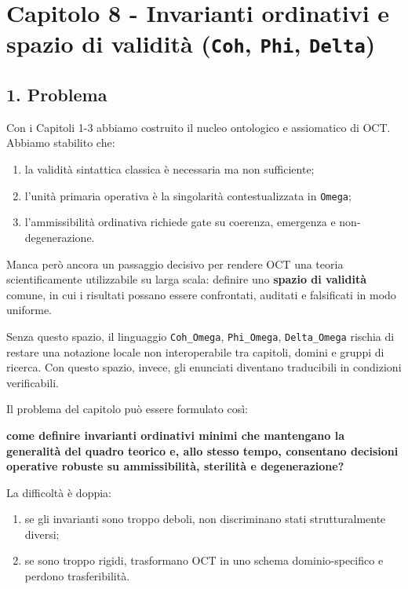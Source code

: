 \chapter{\texorpdfstring{Capitolo 8 - Invarianti ordinativi e spazio di validità (\texttt{Coh}, \texttt{Phi}, \texttt{Delta})}{Capitolo 8 - Invarianti ordinativi e spazio di validità (Coh, Phi, Delta)}}

\section{1. Problema}

Con i Capitoli 1-3 abbiamo costruito il nucleo ontologico e assiomatico di OCT. Abbiamo stabilito che:

\begin{enumerate}
\def\labelenumi{\arabic{enumi}.}
\tightlist
\item
  la validità sintattica classica è necessaria ma non sufficiente;
\item
  l'unità primaria operativa è la singolarità contestualizzata in \texttt{Omega};
\item
  l'ammissibilità ordinativa richiede gate su coerenza, emergenza e non-degenerazione.
\end{enumerate}

Manca però ancora un passaggio decisivo per rendere OCT una teoria scientificamente utilizzabile su larga scala: definire uno \textbf{spazio di validità} comune, in cui i risultati possano essere confrontati, auditati e falsificati in modo uniforme.

Senza questo spazio, il linguaggio \texttt{Coh\_Omega}, \texttt{Phi\_Omega}, \texttt{Delta\_Omega} rischia di restare una notazione locale non interoperabile tra capitoli, domini e gruppi di ricerca. Con questo spazio, invece, gli enunciati diventano traducibili in condizioni verificabili.

Il problema del capitolo può essere formulato così:

\textbf{come definire invarianti ordinativi minimi che mantengano la generalità del quadro teorico e, allo stesso tempo, consentano decisioni operative robuste su ammissibilità, sterilità e degenerazione?}

La difficoltà è doppia:

\begin{enumerate}
\def\labelenumi{\arabic{enumi}.}
\tightlist
\item
  se gli invarianti sono troppo deboli, non discriminano stati strutturalmente diversi;
\item
  se sono troppo rigidi, trasformano OCT in uno schema dominio-specifico e perdono trasferibilità.
\end{enumerate}

